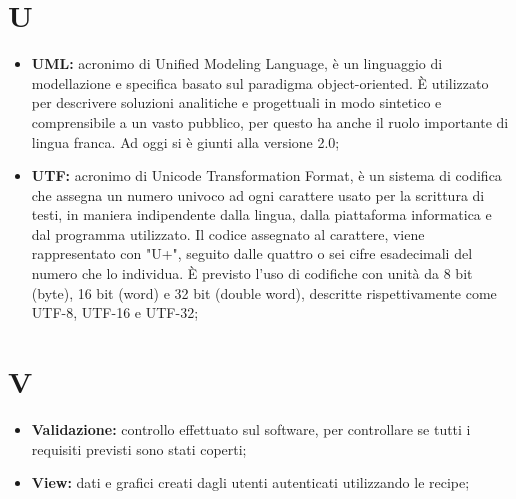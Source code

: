 %



\section*{U} %
\label{sec:u}
	\begin{itemize}
		\item \textbf{UML:} acronimo di Unified Modeling Language, è un linguaggio di modellazione e specifica basato sul paradigma object-oriented. È utilizzato per descrivere soluzioni analitiche e progettuali in modo sintetico e comprensibile a un vasto pubblico, per questo ha anche il ruolo importante di lingua franca. Ad oggi si è giunti alla versione 2.0;
		\item \textbf{UTF:} acronimo di Unicode Transformation Format, è un sistema di codifica che assegna un numero univoco ad ogni carattere usato per la scrittura di testi, in maniera indipendente dalla lingua, dalla piattaforma informatica e dal programma utilizzato. Il codice assegnato al carattere, viene rappresentato con "U+", seguito dalle quattro o sei cifre esadecimali del numero che lo individua. È previsto l'uso di codifiche con unità da 8 bit (byte), 16 bit (word) e 32 bit (double word), descritte rispettivamente come UTF-8, UTF-16 e UTF-32;
	\end{itemize}
\pagebreak

\section*{V} %
\label{sec:v}
	\begin{itemize}
		\item \textbf{Validazione:} controllo effettuato sul software, per controllare se tutti i requisiti previsti sono stati coperti;
		\item \textbf{View:} dati e grafici creati dagli utenti autenticati utilizzando le recipe;
	\end{itemize}
\pagebreak

